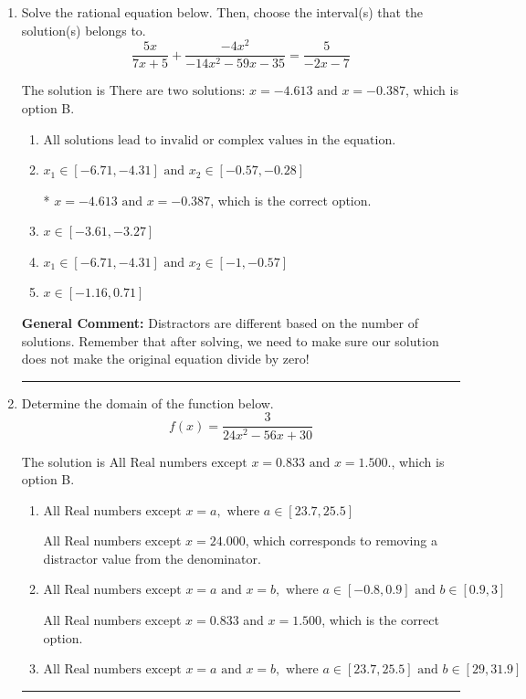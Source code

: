 \documentclass{extbook}[14pt]
\newcommand{\litem}[1]{\item #1

\rule{\textwidth}{0.4pt}}
\begin{document}
\begin{enumerate}\litem{
Solve the rational equation below. Then, choose the interval(s) that the solution(s) belongs to.
\[ \frac{5x}{7x + 5} + \frac{-4x^{2}}{-14x^{2} -59 x -35} = \frac{5}{-2x -7} \]

The solution is \( \text{There are two solutions: } x = -4.613 \text{ and } x = -0.387 \), which is option B.\begin{enumerate}[label=\Alph*.]
\item \( \text{All solutions lead to invalid or complex values in the equation.} \)


\item \( x_1 \in [-6.71, -4.31] \text{ and } x_2 \in [-0.57,-0.28] \)

* $x = -4.613 \text{ and } x = -0.387$, which is the correct option.
\item \( x \in [-3.61,-3.27] \)


\item \( x_1 \in [-6.71, -4.31] \text{ and } x_2 \in [-1,-0.57] \)


\item \( x \in [-1.16,0.71] \)


\end{enumerate}

\textbf{General Comment:} Distractors are different based on the number of solutions. Remember that after solving, we need to make sure our solution does not make the original equation divide by zero!
}
\litem{
Determine the domain of the function below.
\[ f(x) = \frac{3}{24x^{2} -56 x + 30} \]

The solution is \( \text{All Real numbers except } x = 0.833 \text{ and } x = 1.500. \), which is option B.\begin{enumerate}[label=\Alph*.]
\item \( \text{All Real numbers except } x = a, \text{ where } a \in [23.7, 25.5] \)

All Real numbers except $x = 24.000$, which corresponds to removing a distractor value from the denominator.
\item \( \text{All Real numbers except } x = a \text{ and } x = b, \text{ where } a \in [-0.8, 0.9] \text{ and } b \in [0.9, 3] \)

All Real numbers except $x = 0.833$ and $x = 1.500$, which is the correct option.
\item \( \text{All Real numbers except } x = a \text{ and } x = b, \text{ where } a \in [23.7, 25.5] \text{ and } b \in [29, 31.9] \)


\end{enumerate}}
\end{enumerate}
\end{document}
